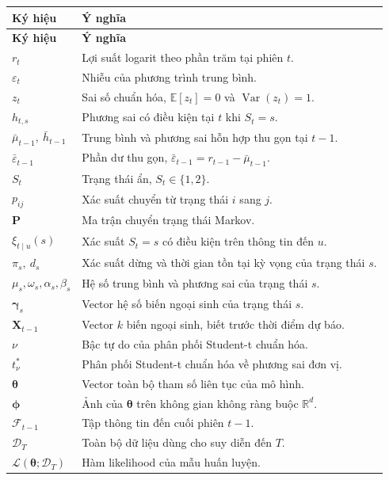 \documentclass[12pt,a4paper]{article}
\numberwithin{equation}{section}
\theoremstyle{definition}
\newcommand{\R}{\mathbb{R}}
\newcommand{\E}{\mathbb{E}}
\newcommand{\Var}{\operatorname{Var}}
\newcommand{\Data}{\mathcal{D}}
\newcommand{\Info}{\mathcal{F}}
\newcommand{\Param}{\symbf{\theta}}
\newcommand{\Xvec}{\symbf{X}}
\newcommand{\Pmat}{\symbf{P}}
\newcommand{\bmgamma}{\symbf{\gamma}}
\newcommand{\vecphi}{\symbf{\phi}}
\begin{document}
{\footnotesize
\begin{longtable}{@{}p{3.0cm}>{\raggedright\arraybackslash}p{12.2cm}@{}}
\toprule
\textbf{Ký hiệu} & \textbf{Ý nghĩa} \\
\midrule
\endfirsthead
\toprule
\textbf{Ký hiệu} & \textbf{Ý nghĩa} \\
\midrule
\endhead
\bottomrule
\endfoot
$r_t$ & Lợi suất logarit theo phần trăm tại phiên $t$. \\
$\varepsilon_t$ & Nhiễu của phương trình trung bình. \\
$z_t$ & Sai số chuẩn hóa, $\E[z_t]=0$ và $\Var(z_t)=1$. \\
$h_{t,s}$ & Phương sai có điều kiện tại $t$ khi $S_t=s$. \\
$\bar\mu_{t-1},\ \bar h_{t-1}$ & Trung bình và phương sai hỗn hợp thu gọn tại $t-1$. \\
$\bar\varepsilon_{t-1}$ & Phần dư thu gọn, $\bar\varepsilon_{t-1}=r_{t-1}-\bar\mu_{t-1}$. \\
$S_t$ & Trạng thái ẩn, $S_t\in\{1,2\}$. \\
$p_{ij}$ & Xác suất chuyển từ trạng thái $i$ sang $j$. \\
$\Pmat$ & Ma trận chuyển trạng thái Markov. \\
$\xi_{t\mid u}(s)$ & Xác suất $S_t=s$ có điều kiện trên thông tin đến $u$. \\
$\pi_s,\ d_s$ & Xác suất dừng và thời gian tồn tại kỳ vọng của trạng thái $s$. \\
$\mu_s,\omega_s,\alpha_s,\beta_s$ & Hệ số trung bình và phương sai của trạng thái $s$. \\
$\bmgamma_s$ & Vector hệ số biến ngoại sinh của trạng thái $s$. \\
$\Xvec_{t-1}$ & Vector $k$ biến ngoại sinh, biết trước thời điểm dự báo. \\
$\nu$ & Bậc tự do của phân phối Student-t chuẩn hóa. \\
$t^{*}_{\nu}$ & Phân phối Student-t chuẩn hóa về phương sai đơn vị. \\
$\Param$ & Vector toàn bộ tham số liên tục của mô hình. \\
$\vecphi$ & Ảnh của $\Param$ trên không gian không ràng buộc $\R^{d}$. \\
$\Info_{t-1}$ & Tập thông tin đến cuối phiên $t-1$. \\
$\Data_T$ & Toàn bộ dữ liệu dùng cho suy diễn đến $T$. \\
$\mathcal{L}(\Param;\Data_T)$ & Hàm likelihood của mẫu huấn luyện. \\

\end{longtable}}
\end{document}
